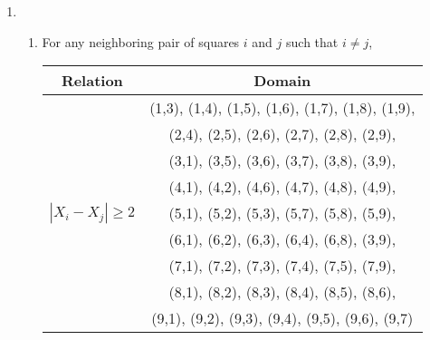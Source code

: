 \documentclass{article}
\begin{document}
\begin{enumerate}
\item
    \begin{enumerate}
    \item
    For any neighboring pair of squares $i$ and $j$ such that $i \neq j$, \\

    \begin{table}[h]
    \centering
    \begin{tabular}{|c|c|}
    \hline
    Relation & Domain \\
    \hline
    \multirow{9}{*}{$|X_i-X_j| \geqslant 2$} & (1,3), (1,4), (1,5), (1,6), (1,7), (1,8), (1,9), \\
            & (2,4), (2,5), (2,6), (2,7), (2,8), (2,9), \\
            & (3,1), (3,5), (3,6), (3,7), (3,8), (3,9), \\
            & (4,1), (4,2), (4,6), (4,7), (4,8), (4,9), \\
            & (5,1), (5,2), (5,3), (5,7), (5,8), (5,9), \\
            & (6,1), (6,2), (6,3), (6,4), (6,8), (3,9), \\
            & (7,1), (7,2), (7,3), (7,4), (7,5), (7,9), \\
            & (8,1), (8,2), (8,3), (8,4), (8,5), (8,6), \\
            & (9,1), (9,2), (9,3), (9,4), (9,5), (9,6), (9,7) \\
    \hline      
    \end{tabular}
    \end{table}


\end{enumerate}
\end{enumerate}
\end{document}
